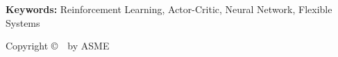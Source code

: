 {{\vspace{10pt}
{\bf Keywords:} Reinforcement Learning, Actor-Critic, Neural Network, Flexible Systems




}}

\vspace{\fill}
{\scriptsize{\hv
\begin{flushbottom}
\begin{flushright}
Copyright \copyright\ \confyear\ by ASME
\end{flushright}
\end{flushbottom}
}}






